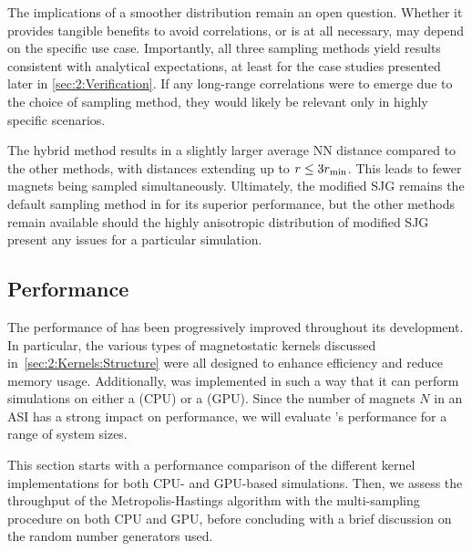 The implications of a smoother distribution remain an open question.
Whether it provides tangible benefits to avoid correlations, or is at all necessary, may depend on the specific use case.
Importantly, all three sampling methods yield results consistent with analytical expectations, at least for the case studies presented later in \cref{sec:2:Verification}.
If any long-range correlations were to emerge due to the choice of sampling method, they would likely be relevant only in highly specific scenarios. \par
The hybrid method results in a slightly larger average NN distance compared to the other methods, with distances extending up to $r \leq 3 r_\mathrm{min}$.
This leads to fewer magnets being sampled simultaneously.
Ultimately, the modified SJG remains the default sampling method in \hotspice for its superior performance, but the other methods remain available should the highly anisotropic distribution of modified SJG present any issues for a particular simulation.

\subsection{Performance}\label{sec:2:Implementation:Performance}
The performance of \hotspice has been progressively improved throughout its development.
In particular, the various types of magnetostatic kernels discussed in~\cref{sec:2:Kernels:Structure} were all designed to enhance efficiency and reduce memory usage.
Additionally, \hotspice was implemented in such a way that it can perform simulations on either a  (CPU) or a  (GPU).
Since the number of magnets $N$ in an ASI has a strong impact on performance, we will evaluate \hotspice's performance for a range of system sizes. \par
This section starts with a performance comparison of the different kernel implementations for both CPU- and GPU-based simulations.
Then, we assess the throughput of the Metropolis-Hastings algorithm with the multi-sampling procedure on both CPU and GPU, before concluding with a brief discussion on the random number generators used.

